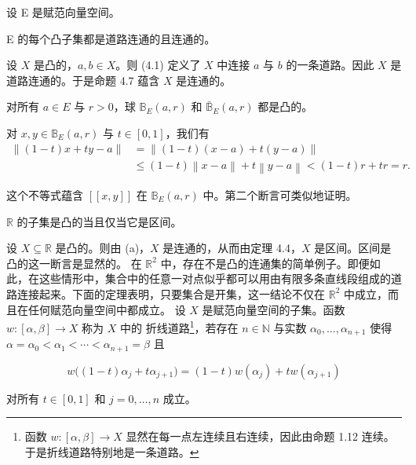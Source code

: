 \begin{remark}

设 E 是赋范向量空间。

\begin{items}
\item

E 的每个凸子集都是道路连通的且连通的。

\proofhead
设 $X$ 是凸的，$a, b \in X$。则 (4.1) 定义了 $X$ 中连接 $a$ 与 $b$ 的一条道路。因此 $X$ 是道路连通的。于是命题 4.7 蕴含 $X$ 是连通的。
\item

对所有 $ a \in E $ 与 $ r > 0 $，球 $ \mathbb{B}_E(a, r) $ 和 $ \bar{\mathbb{B}}_E(a, r) $ 都是凸的。

\proofhead
对 $ x, y \in \mathbb{B}_E(a, r) $ 与 $ t \in [0, 1] $，我们有
\begin{equation*}
\begin{aligned}
\|(1-t)x+ty-a\|&=\|(1-t)(x-a)+t(y-a)\|\\&\leq(1-t)\left\|x-a\right\|+t\left\|y-a\right\|<(1-t)r+tr=r.
\end{aligned}
\end{equation*}

这个不等式蕴含 $ \left[\!\!\left[x, y\right]\!\!\right] $ 在 $ \mathbb{B}_E(a, r) $ 中。第二个断言可类似地证明。

\item

$ \mathbb{R} $ 的子集是凸的当且仅当它是区间。

\proofhead
设 $X \subseteq \mathbb{R}$ 是凸的。则由 (a)，$X$ 是连通的，从而由定理 4.4，$X$ 是区间。区间是凸的这一断言是显然的。
在 $\mathbb{R}^2$ 中，存在不是凸的连通集的简单例子。即便如此，在这些情形中，集合中的任意一对点似乎都可以用由有限多条直线段组成的道路连接起来。下面的定理表明，只要集合是开集，这一结论不仅在 $\mathbb{R}^2$ 中成立，而且在任何赋范向量空间中都成立。
设 $X$ 是赋范向量空间的子集。函数 $w: [\alpha, \beta] \to X$ 称为 $X$ 中的 $\text{折线道路}$\footnote{函数 $w: [\alpha, \beta] \to X$ 显然在每一点左连续且右连续，因此由命题 1.12 连续。于是折线道路特别地是一条道路。}，若存在 $n \in \mathbb{N}$ 与实数 $\alpha_0, \ldots, \alpha_{n+1}$ 使得 $\alpha = \alpha_0 < \alpha_1 < \cdots < \alpha_{n+1} = \beta$ 且
\end{items}

\[
w\big((1-t)\alpha_{j}+t\alpha_{j+1}\big)=(1-t)w(\alpha_{j})+t w(\alpha_{j+1})
\]

对所有 $ t \in [0,1] $ 和 $ j = 0, \ldots, n $ 成立。

\end{remark}

